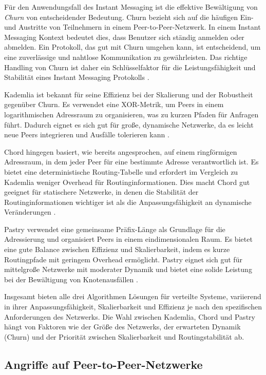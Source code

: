 Für den Anwendungsfall des Instant Messaging ist die effektive Bewältigung von \textit{Churn} von entscheidender Bedeutung. Churn bezieht sich auf die häufigen Ein- und Austritte von Teilnehmern in einem Peer-to-Peer-Netzwerk. In einem Instant Messaging Kontext bedeutet dies, dass Benutzer sich ständig anmelden oder abmelden. Ein Protokoll, das gut mit Churn umgehen kann, ist entscheidend, um eine zuverlässige und nahtlose Kommunikation zu gewährleisten. Das richtige Handling von Churn ist daher ein Schlüsselfaktor für die Leistungsfähigkeit und Stabilität eines Instant Messaging Protokolls \parencite[S. 316-317]{Peris_KademliaChurn}.

Kademlia ist bekannt für seine Effizienz bei der Skalierung und der Robustheit gegenüber Churn. Es verwendet eine XOR-Metrik, um Peers in einem logarithmischen Adressraum zu organisieren, was zu kurzen Pfaden für Anfragen führt. Dadurch eignet es sich gut für große, dynamische Netzwerke, da es leicht neue Peers integrieren und Ausfälle tolerieren kann \Parencite{MedranoChavez_ChordKademliaHighChurnScenarios}.

Chord hingegen basiert, wie bereits angesprochen, auf einem ringförmigen Adressraum, in dem jeder Peer für eine bestimmte Adresse verantwortlich ist. Es bietet eine deterministische Routing-Tabelle und erfordert im Vergleich zu Kademlia weniger Overhead für Routinginformationen. Dies macht Chord gut geeignet für statischere Netzwerke, in denen die Stabilität der Routinginformationen wichtiger ist als die Anpassungsfähigkeit an dynamische Veränderungen \parencite{Stoica_Chord}.

Pastry verwendet eine gemeinsame Präfix-Länge als Grundlage für die Adressierung und organisiert Peers in einem eindimensionalen Raum. Es bietet eine gute Balance zwischen Effizienz und Skalierbarkeit, indem es kurze Routingpfade mit geringem Overhead ermöglicht. Pastry eignet sich gut für mittelgroße Netzwerke mit moderater Dynamik und bietet eine solide Leistung bei der Bewältigung von Knotenausfällen \parencite{Rowstron_Pastry}.

Insgesamt bieten alle drei Algorithmen Lösungen für verteilte Systeme, variierend in ihrer Anpassungsfähigkeit, Skalierbarkeit und Effizienz je nach den spezifischen Anforderungen des Netzwerks. Die Wahl zwischen Kademlia, Chord und Pastry hängt von Faktoren wie der Größe des Netzwerks, der erwarteten Dynamik (Churn) und der Priorität zwischen Skalierbarkeit und Routingstabilität ab.

\subsection{Angriffe auf Peer-to-Peer-Netzwerke}

